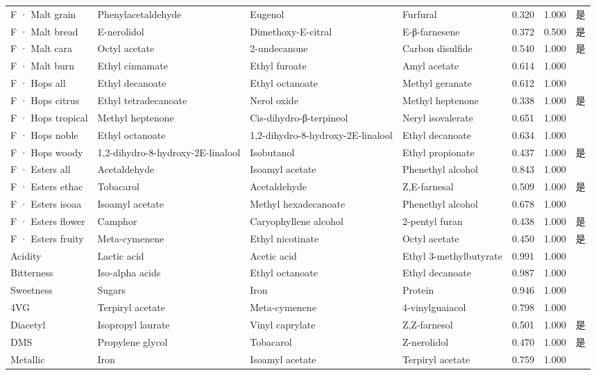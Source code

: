 {\begin{longtable}{llllrrl}
F · Malt grain & Phenylacetaldehyde & Eugenol & Furfural & 0.320 & 1.000 & 是 \\
F · Malt bread & E-nerolidol & Dimethoxy-E-citral & E-β-farnesene & 0.372 & 0.500 & 是 \\
F · Malt cara & Octyl acetate & 2-undecanone & Carbon disulfide & 0.540 & 1.000 & 是 \\
F · Malt burn & Ethyl cinnamate & Ethyl furoate & Amyl acetate & 0.614 & 1.000 &  \\
F · Hops all & Ethyl decanoate & Ethyl octanoate & Methyl geranate & 0.612 & 1.000 &  \\
F · Hops citrus & Ethyl tetradecanoate & Nerol oxide & Methyl heptenone & 0.338 & 1.000 & 是 \\
F · Hops tropical & Methyl heptenone & Cis-dihydro-β-terpineol & Neryl isovalerate & 0.651 & 1.000 &  \\
F · Hops noble & Ethyl octanoate & 1,2-dihydro-8-hydroxy-2E-linalool & Ethyl decanoate & 0.634 & 1.000 &  \\
F · Hops woody & 1,2-dihydro-8-hydroxy-2E-linalool & Isobutanol & Ethyl propionate & 0.437 & 1.000 & 是 \\
F · Esters all & Acetaldehyde & Isoamyl acetate & Phenethyl alcohol & 0.843 & 1.000 &  \\
F · Esters ethac & Tobacarol & Acetaldehyde & Z,E-farnesal & 0.509 & 1.000 & 是 \\
F · Esters isoaa & Isoamyl acetate & Methyl hexadecanoate & Phenethyl alcohol & 0.678 & 1.000 &  \\
F · Esters flower & Camphor & Caryophyllene alcohol & 2-pentyl furan & 0.438 & 1.000 & 是 \\
F · Esters fruity & Meta-cymenene & Ethyl nicotinate & Octyl acetate & 0.450 & 1.000 & 是 \\
Acidity & Lactic acid & Acetic acid & Ethyl 3-methylbutyrate & 0.991 & 1.000 &  \\
Bitterness & Iso-alpha acids & Ethyl octanoate & Ethyl decanoate & 0.987 & 1.000 &  \\
Sweetness & Sugars & Iron & Protein & 0.946 & 1.000 &  \\
4VG & Terpiryl acetate & Meta-cymenene & 4-vinylguaiacol & 0.798 & 1.000 &  \\
Diacetyl & Isopropyl laurate & Vinyl caprylate & Z,Z-farnesol & 0.501 & 1.000 & 是 \\
DMS & Propylene glycol & Tobacarol & Z-nerolidol & 0.470 & 1.000 & 是 \\
Metallic & Iron & Isoamyl acetate & Terpiryl acetate & 0.759 & 1.000 &  \\

\end{longtable}}
